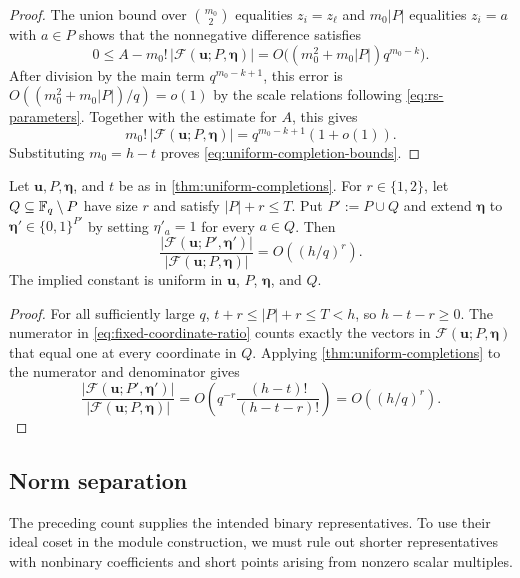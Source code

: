 \begin{proof}
The union bound over $\binom{m_0}{2}$ equalities $z_i=z_\ell$ and
$m_0|P|$ equalities $z_i=a$ with $a\in P$ shows that the nonnegative
difference satisfies
\[
 0\le A-m_0!\,|\mathcal F(\mathbf u;P,\boldsymbol\eta)|
 =O\bigl((m_0^2+m_0|P|)q^{m_0-k}\bigr).
\]
After division by the main term $q^{m_0-k+1}$, this error is
$O((m_0^2+m_0|P|)/q)=o(1)$ by the scale relations following
\cref{eq:rs-parameters}.  Together with the estimate for $A$, this gives
\[
 m_0!\,|\mathcal F(\mathbf u;P,\boldsymbol\eta)|
 =q^{m_0-k+1}(1+o(1)).
\]
Substituting $m_0=h-t$ proves \cref{eq:uniform-completion-bounds}.
\end{proof}

\begin{corollary}
\label{cor:fixed-coordinate-ratio}
Let $\mathbf u,P,\boldsymbol\eta$, and $t$ be as in
\cref{thm:uniform-completions}.  For $r\in\{1,2\}$, let
$Q\subseteq\mathbb F_q\setminus P$ have size $r$ and satisfy $|P|+r\le T$.
Put $P':=P\cup Q$ and extend $\boldsymbol\eta$ to
$\boldsymbol\eta'\in\{0,1\}^{P'}$ by setting $\eta'_a=1$ for every $a\in Q$.
Then
\begin{equation}
\label{eq:fixed-coordinate-ratio}
 \frac{|\mathcal F(\mathbf u;P',\boldsymbol\eta')|}
 {|\mathcal F(\mathbf u;P,\boldsymbol\eta)|}
 =O\left((h/q)^r\right).
\end{equation}
The implied constant is uniform in $\mathbf u$, $P$, $\boldsymbol\eta$, and
$Q$.
\end{corollary}

\begin{proof}
For all sufficiently large $q$,
$t+r\le|P|+r\le T<h$, so $h-t-r\ge0$.  The numerator in
\cref{eq:fixed-coordinate-ratio} counts exactly the vectors in
$\mathcal F(\mathbf u;P,\boldsymbol\eta)$ that equal one at every coordinate
in $Q$.  Applying \cref{thm:uniform-completions} to the numerator and
denominator gives
\[
 \frac{|\mathcal F(\mathbf u;P',\boldsymbol\eta')|}
 {|\mathcal F(\mathbf u;P,\boldsymbol\eta)|}
 =O\left(q^{-r}\frac{(h-t)!}{(h-t-r)!}\right)
 =O\left((h/q)^r\right).
\]
\end{proof}

\subsection{Norm separation}

The preceding count supplies the intended binary representatives.  To use
their ideal coset in the module construction, we must rule out shorter
representatives with nonbinary coefficients and short points arising from
nonzero scalar multiples.

